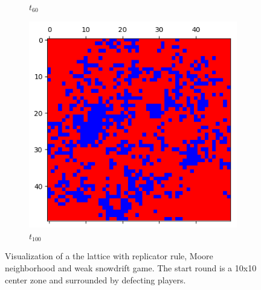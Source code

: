\documentclass[letterpaper]{article}
\begin{document}
\begin{figure}[H]
\begin{subfigure}{.33\textwidth}
      \caption{$t_{60}$}
    \end{subfigure}
    \begin{subfigure}{.33\textwidth}
      \centering
      \includegraphics[width=1\linewidth]{images/assign2/part32-defect/t100}
      \caption{$t_{100}$}
    \end{subfigure}
    \caption{Visualization of a the lattice with replicator rule,
    Moore neighborhood and weak snowdrift game. The start round is
    a 10x10 center zone and surrounded by defecting players.}
    \label{fig:visupart32-defect}
\end{figure}
\end{document}
